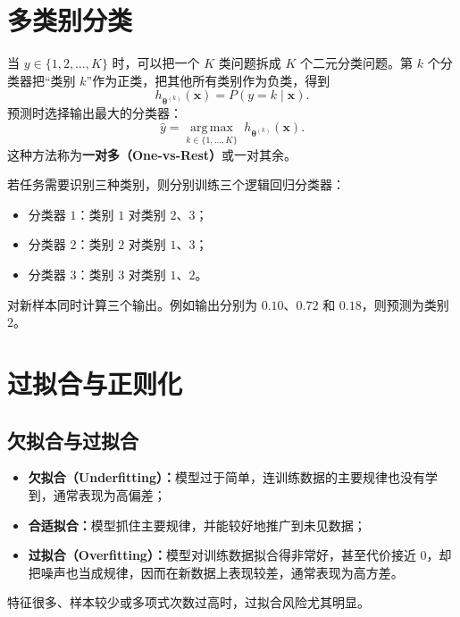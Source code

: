\documentclass[12pt,a4paper]{ctexart}
\newcommand{\concept}[1]{\textbf{\textcolor{DefineColor}{#1}}}
\begin{document}
\section{多类别分类}

\begin{definitionbox}[一对多方法]
当 $y\in\{1,2,\ldots,K\}$ 时，可以把一个 $K$ 类问题拆成 $K$ 个二元分类问题。第 $k$ 个分类器把“类别 $k$”作为正类，把其他所有类别作为负类，得到
\[
  h_{\boldsymbol{\theta}^{(k)}}(\mathbf{x})
  =P(y=k\mid\mathbf{x}).
\]
预测时选择输出最大的分类器：
\[
  \hat y
  =\underset{k\in\{1,\ldots,K\}}{\operatorname{arg\,max}}
  \;h_{\boldsymbol{\theta}^{(k)}}(\mathbf{x}).
\]
这种方法称为\concept{一对多（One-vs-Rest）}或一对其余。
\end{definitionbox}

\begin{examplebox}[三类别分类]
若任务需要识别三种类别，则分别训练三个逻辑回归分类器：
\begin{itemize}
  \item 分类器 $1$：类别 $1$ 对类别 $2$、$3$；
  \item 分类器 $2$：类别 $2$ 对类别 $1$、$3$；
  \item 分类器 $3$：类别 $3$ 对类别 $1$、$2$。
\end{itemize}
对新样本同时计算三个输出。例如输出分别为 $0.10$、$0.72$ 和 $0.18$，则预测为类别 $2$。
\end{examplebox}

\section{过拟合与正则化}

\subsection{欠拟合与过拟合}

\begin{definitionbox}[模型拟合的三种状态]
\begin{itemize}
  \item \textbf{欠拟合（Underfitting）：}模型过于简单，连训练数据的主要规律也没有学到，通常表现为高偏差；
  \item \textbf{合适拟合：}模型抓住主要规律，并能较好地推广到未见数据；
  \item \textbf{过拟合（Overfitting）：}模型对训练数据拟合得非常好，甚至代价接近 $0$，却把噪声也当成规律，因而在新数据上表现较差，通常表现为高方差。
\end{itemize}
特征很多、样本较少或多项式次数过高时，过拟合风险尤其明显。
\end{definitionbox}
\end{document}
